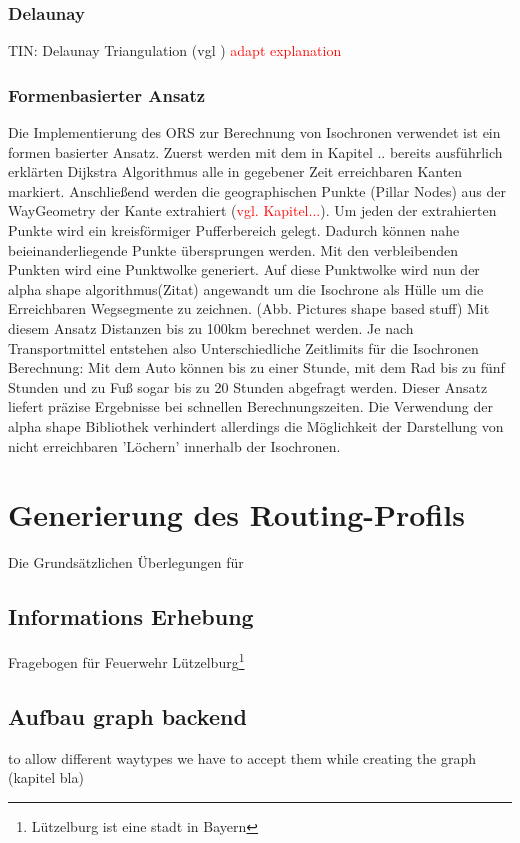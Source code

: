 \documentclass[10pt,a4paper]{article}
\newcommand\todo[1]{\textcolor{red}{#1}}
\begin{document}
\subsubsection{Delaunay}
TIN: Delaunay Triangulation
(vgl \cite{isochrones})
\todo{adapt explanation}


\subsubsection{Formenbasierter Ansatz}
Die Implementierung des ORS zur Berechnung von Isochronen verwendet ist ein formen basierter Ansatz. Zuerst werden mit dem in Kapitel .. bereits ausführlich erklärten Dijkstra Algorithmus alle in gegebener Zeit erreichbaren Kanten markiert. Anschließend werden die geographischen Punkte (Pillar Nodes) aus der  WayGeometry der Kante extrahiert (\todo{vgl. Kapitel...}).  Um jeden der extrahierten Punkte wird ein kreisförmiger Pufferbereich gelegt. Dadurch können nahe beieinanderliegende Punkte übersprungen werden. Mit den verbleibenden Punkten wird eine Punktwolke generiert. Auf diese Punktwolke wird nun der alpha shape algorithmus(Zitat) angewandt um die Isochrone als Hülle um die Erreichbaren Wegsegmente zu zeichnen.
(Abb. Pictures shape based stuff)
Mit diesem Ansatz Distanzen bis zu 100km berechnet werden. Je nach Transportmittel entstehen also Unterschiedliche Zeitlimits für die Isochronen Berechnung: Mit dem Auto können bis zu einer Stunde, mit dem Rad bis zu fünf Stunden und zu Fuß sogar bis zu 20 Stunden abgefragt werden. Dieser Ansatz liefert präzise Ergebnisse bei schnellen Berechnungszeiten. Die Verwendung der alpha shape Bibliothek verhindert allerdings die Möglichkeit der Darstellung von nicht erreichbaren 'Löchern' innerhalb der Isochronen.


\section{Generierung des Routing-Profils}
Die Grundsätzlichen Überlegungen für 
\subsection{Informations Erhebung}
Fragebogen für Feuerwehr Lützelburg\footnote{Lützelburg ist eine stadt in Bayern}

\subsection{Aufbau graph backend}
to allow different waytypes we have to accept them while creating the graph (kapitel bla)
\end{document}
